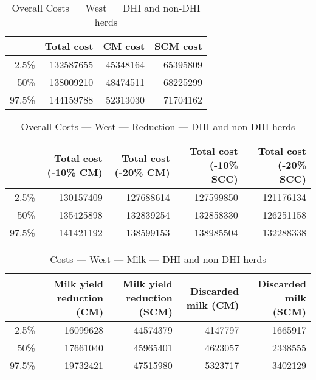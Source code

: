 \documentclass{article}\usepackage[]{graphicx}\usepackage[]{color}
\begin{document}
\begin{table}[ht]
\centering
\begin{tabular}{rrrr}
  \hline
 & Total cost & CM cost & SCM cost \\ 
  \hline
2.5\% & 132587655 & 45348164 & 65395809 \\ 
  50\% & 138009210 & 48474511 & 68225299 \\ 
  97.5\% & 144159788 & 52313030 & 71704162 \\ 
   \hline
\end{tabular}
\caption{Overall Costs --- West --- DHI and non-DHI herds} 
\label{tab:west2:overall}
\end{table}
\begin{table}[ht]
\centering
\begin{tabular}{rrrrr}
  \hline
 & Total cost (-10\% CM) & Total cost (-20\% CM) & Total cost (-10\% SCC) & Total cost (-20\% SCC) \\ 
  \hline
2.5\% & 130157409 & 127688614 & 127599850 & 121176134 \\ 
  50\% & 135425898 & 132839254 & 132858330 & 126251158 \\ 
  97.5\% & 141421192 & 138599153 & 138985504 & 132288338 \\ 
   \hline
\end{tabular}
\caption{Overall Costs --- West --- Reduction --- DHI and non-DHI herds} 
\label{tab:west2:reduction}
\end{table}
\begin{table}[ht]
\centering
\begin{tabular}{rrrrr}
  \hline
 & Milk yield reduction (CM) & Milk yield reduction (SCM) & Discarded milk (CM) & Discarded milk (SCM) \\ 
  \hline
2.5\% & 16099628 & 44574379 & 4147797 & 1665917 \\ 
  50\% & 17661040 & 45965401 & 4623057 & 2338555 \\ 
  97.5\% & 19732421 & 47515980 & 5323717 & 3402129 \\ 
   \hline
\end{tabular}
\caption{Costs --- West --- Milk --- DHI and non-DHI herds} 
\label{tab:west2:a}
\end{table}
\end{document}
